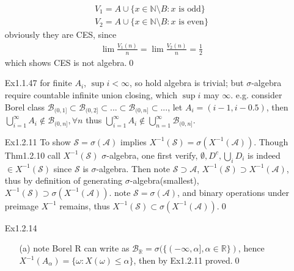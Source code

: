 \documentclass[paper=a4, fontsize=11pt]{scrartcl} %
\numberwithin{equation}{section} %
\numberwithin{figure}{section} %
\numberwithin{table}{section} %
\begin{document}
\begin{itemize}
	 \begin{align}
	 	V_1 = A \cup \{x\in \mathbb{N}\setminus B: x\text{ is odd} \}\\
	 	V_2 = A \cup \{x\in \mathbb{N}\setminus B: x\text{ is even} \}
	 \end{align}
	 obviously they are CES, since
	 \begin{align}
	 	\lim \frac{V_1(n)}{n} = \lim \frac{V_2(n)}{n} =\frac{1}{2}
	 \end{align}
	 which shows CES is not algebra.\qed
	 \item[Ex1.1.47] for finite $A_i$, $\sup i<\infty$, so hold algebra is trivial; but $\sigma$-algebra require countable infinite union closing, which $\sup i$ may $\infty$. e.g. consider Borel class $\mathcal{B}_{(0,1]}\subset\mathcal{B}_{(0,2]}\subset...\subset\mathcal{B}_{(0,n]}\subset...$, let $A_i=(i-1, i-0.5)$, then $\bigcup_{i=1}^\infty A_i\notin \mathcal{B}_{(0,n]},\forall n$ thus $\bigcup_{i=1}^\infty A_i\notin \bigcup_{n=1}^\infty \mathcal{B}_{(0,n]}$.
	 \item[Ex1.2.11] To show $\mathcal{S}=\sigma(\mathcal{A})$ implies $X^{-1}(\mathcal{S})=\sigma(X^{-1}(\mathcal{A}))$. Though Thm1.2.10 call $X^{-1}(\mathcal{S})$ $\sigma$-algebra, one first verify, $\emptyset,D^c,\bigcup_i D_i$ is indeed $\in X^{-1}(\mathcal{S})$ since $\mathcal{S}$ is $\sigma$-algebra. Then note $\mathcal{S}\supset \mathcal{A}$, $X^{-1}(\mathcal{S}) \supset X^{-1}(\mathcal{A})$, thus by definition of generating $\sigma$-algebra(smallest), $X^{-1}(\mathcal{S}) \supset \sigma(X^{-1}(\mathcal{A}))$. note $\mathcal{S}=\sigma(\mathcal{A})$, and binary operations under preimage $X^{-1}$ remains, thus $X^{-1}(\mathcal{S}) \subset \sigma(X^{-1}(\mathcal{A}))$.\qed
	 \item[Ex1.2.14]
	 \begin{itemize}
	 	\item[(a)] note Borel R can write as $\mathcal{B}_{\mathbb{R}}= \sigma(\{(-\infty,\alpha],\alpha\in \mathbb{R}\})$, hence $X^{-1}(A_\alpha) = \{\omega:X(\omega)\leq \alpha\}$, then by Ex1.2.11 proved.\qed

\end{itemize}
\end{itemize}
\end{document}
